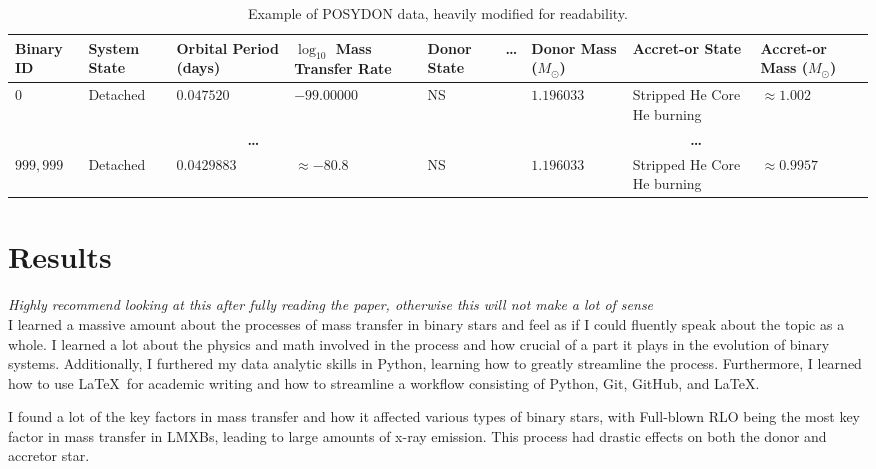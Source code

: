 \documentclass[12pt, a4paper]{article}
\begin{document}
    \begin{table}[H]
        \footnotesize
            \centering
            \begin{tabularx}{\textwidth}{||X|X|X|X|X||X||X|X|X||}
                \hline 
                \textbf{Binary ID} & 
                \textbf{System State} & 
                \textbf{Orbital Period (days)} & 
                \textbf{$\log_{10}$ Mass Transfer Rate} & 
                \textbf{Donor State} & 
                \textbf{\ldots}&
                \textbf{Donor Mass} ($M_\odot$) & 
                \textbf{Accret-or State} & 
                \textbf{Accret-or Mass} ($M_\odot$) \\
                \hline \hline
                $0$ & Detached & $0.047520$ & $-99.00000$ & NS & & $1.196033$ & Stripped He Core He burning & $\approx 1.002$ \\
                \hline
                \multicolumn{5}{||c||}{\textbf{\ldots}} & & \multicolumn{3}{c||}{\textbf{\ldots}}\\
                \hline
                $999,999$ & Detached & $0.0429883$ & $\approx -80.8$ & NS & & $1.196033$ & Stripped He Core He burning & $\approx 0.9957$ \\
                \hline
            \end{tabularx}
            \caption{Example of POSYDON data, heavily modified for readability.}
            \label{POSYDONDataExample}
        \end{table}
        


\section{Results}
    \textit{Highly recommend looking at this after fully reading the paper, otherwise this will not make a lot of sense}\\
    I learned a massive amount about the processes of mass transfer in binary stars and feel as if I could fluently speak about the topic as a whole. I learned a lot about the physics and math involved in the process and how crucial of a part it plays in the evolution of binary systems. Additionally, I furthered my data analytic skills in Python, learning how to greatly streamline the process. Furthermore, I learned how to use \LaTeX~for academic writing and how to streamline a workflow consisting of Python, Git, GitHub, and \LaTeX.

    I found a lot of the key factors in mass transfer and how it affected various types of binary stars, with Full-blown RLO being the most key factor in mass transfer in LMXBs, leading to large amounts of x-ray emission. This process had drastic effects on both the donor and accretor star.
\end{document}
